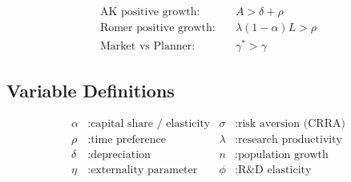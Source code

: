 \begin{align*}
\text{AK positive growth:} &\quad A > \delta + \rho \\
\text{Romer positive growth:} &\quad \lambda(1-\alpha)L > \rho \\
\text{Market vs Planner:} &\quad \gamma^* > \gamma
\end{align*}

\subsection{Variable Definitions}

\begin{align*}
\alpha &: \text{capital share / elasticity} &
\sigma &: \text{risk aversion (CRRA)} \\
\rho &: \text{time preference} &
\lambda &: \text{research productivity} \\
\delta &: \text{depreciation} &
n &: \text{population growth} \\
\eta &: \text{externality parameter} &
\phi &: \text{R\&D elasticity}
\end{align*}
